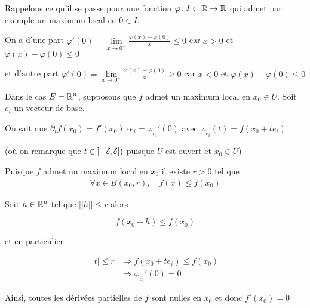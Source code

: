 \documentclass[french,a4paper,10pt]{article}
\begin{document}
	\begin{oc-proof}
		Rappelons ce qu'il se passe pour une fonction $\varphi\colon I\subset \mathbb{R}\to\mathbb{R}$ qui admet par exemple un maximum local en $0\in I$.
		
		On a d'une part $\varphi'(0)=\lim\limits_{x\to0^+}\frac{\varphi(x)-\varphi(0)}x\le 0$
		car $x>0$ et $\varphi(x)-\varphi(0)\le 0$
		
		et d'autre part $\varphi'(0)=\lim\limits_{x\to0^-}\frac{\varphi(x)-\varphi(0)}x\ge 0$ car $x<0$ et $\varphi(x)-\varphi(0)\le 0$
		
		Dans le cas $E=\mathbb{R}^n$, supposons que $f$ admet un maximum local en $x_0\in U$. Soit $e_i$ un vecteur de base.
		
		On sait que $\partial_i f(x_0)=f'(x_0)\cdot e_i=\varphi_{e_i}'(0)$ avec $\varphi_{e_i}(t)=f(x_0+te_i)$
		
		(où on remarque que $t\in\mathopen{]}-\delta,\delta\mathclose{[})$ puisque $U$ est ouvert et $x_0\in U$)
		
		Puisque $f$ admet un maximum local en $x_0$ il existe $r>0$ tel que
		\[\begin{aligned}
			\forall x\in B(x_0, r),\quad f(x)\le f(x_0)
		\end{aligned}\]
	
		Soit $h\in\mathbb{R}^n$ tel que $||h||\le r$ alors
		
		\[
		f(x_0+h)\le f(x_0)
		\]
		
		et en particulier
		
		\[\begin{aligned}
			|t|\le r&\Longrightarrow f(x_0+t e_i)\le f(x_0)\\
			&\Longrightarrow\varphi_{e_i}'(0)=0
		\end{aligned}\]
	
		Ainsi, toutes les dérivées partielles de $f$ sont nulles en $x_0$ et donc $f'(x_0)=0$
		
	\end{oc-proof}
\end{document}
